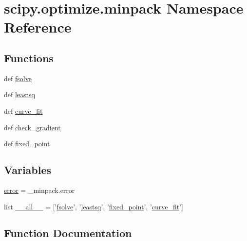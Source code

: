 \hypertarget{namespacescipy_1_1optimize_1_1minpack}{}\section{scipy.\+optimize.\+minpack Namespace Reference}
\label{namespacescipy_1_1optimize_1_1minpack}
\subsection*{Functions}
\begin{DoxyCompactItemize}
\item 
def \hyperlink{namespacescipy_1_1optimize_1_1minpack_ac9bbc04a1a6c71c7c20a7d4585930ede}{fsolve}
\item 
def \hyperlink{namespacescipy_1_1optimize_1_1minpack_a557a87aac1b0023834a8b6dc1ed736c3}{leastsq}
\item 
def \hyperlink{namespacescipy_1_1optimize_1_1minpack_aac476bc8d680f5724391c218fdc113e4}{curve\+\_\+fit}
\item 
def \hyperlink{namespacescipy_1_1optimize_1_1minpack_a7e64883f9c92f8cc5ac4ded7b518ed1b}{check\+\_\+gradient}
\item 
def \hyperlink{namespacescipy_1_1optimize_1_1minpack_adc6af5788c88efbd1c0858ba1f9ec807}{fixed\+\_\+point}
\end{DoxyCompactItemize}
\subsection*{Variables}
\begin{DoxyCompactItemize}
\item 
\hyperlink{namespacescipy_1_1optimize_1_1minpack_a2e3b2c63236fc8b37929ddbd17b69d7e}{error} = \+\_\+minpack.\+error
\item 
list \hyperlink{namespacescipy_1_1optimize_1_1minpack_aa93b4148ea95eb00585881c3bab37888}{\+\_\+\+\_\+all\+\_\+\+\_\+} = \mbox{[}'\hyperlink{namespacescipy_1_1optimize_1_1minpack_ac9bbc04a1a6c71c7c20a7d4585930ede}{fsolve}', '\hyperlink{namespacescipy_1_1optimize_1_1minpack_a557a87aac1b0023834a8b6dc1ed736c3}{leastsq}', '\hyperlink{namespacescipy_1_1optimize_1_1minpack_adc6af5788c88efbd1c0858ba1f9ec807}{fixed\+\_\+point}', '\hyperlink{namespacescipy_1_1optimize_1_1minpack_aac476bc8d680f5724391c218fdc113e4}{curve\+\_\+fit}'\mbox{]}
\end{DoxyCompactItemize}


\subsection{Function Documentation}
\hypertarget{namespacescipy_1_1optimize_1_1minpack_a7e64883f9c92f8cc5ac4ded7b518ed1b}{}

